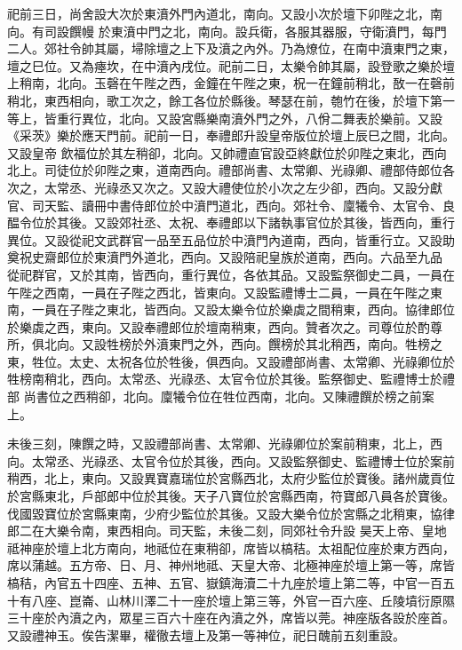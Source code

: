 \begin{pinyinscope}
 祀前三日，尚舍設大次於東濆外門內道北，南向。又設小次於壇下卯陛之北，南向。有司設饌幔
 於東濆中門之北，南向。設兵衛，各服其器服，守衛濆門，每門二人。郊社令帥其屬，埽除壇之上下及濆之內外。乃為燎位，在南中濆東門之東，壇之巳位。又為瘞坎，在中濆內戌位。祀前二日，太樂令帥其屬，設登歌之樂於壇上稍南，北向。玉磬在午陛之西，金鐘在午陛之東，柷一在鐘前稍北，敔一在磬前稍北，東西相向，歌工次之，餘工各位於縣後。琴瑟在前，匏竹在後，於壇下第一等上，皆重行異位，北向。又設宮縣樂南濆外門之外，八佾二舞表於樂前。又設《采茨》樂於應天門前。祀前一日，奉禮郎升設皇帝版位於壇上辰巳之間，北向。又設皇帝
 飲福位於其左稍卻，北向。又帥禮直官設亞終獻位於卯陛之東北，西向北上。司徒位於卯陛之東，道南西向。禮部尚書、太常卿、光祿卿、禮部侍郎位各次之，太常丞、光祿丞又次之。又設大禮使位於小次之左少卻，西向。又設分獻官、司天監、讀冊中書侍郎位於中濆門道北，西向。郊社令、廩犧令、太官令、良醖令位於其後。又設郊社丞、太祝、奉禮郎以下諸執事官位於其後，皆西向，重行異位。又設從祀文武群官一品至五品位於中濆門內道南，西向，皆重行立。又設助奠祝史齋郎位於東濆門外道北，西向。又設陪祀皇族於道南，西向。六品至九品
 從祀群官，又於其南，皆西向，重行異位，各依其品。又設監祭御史二員，一員在午陛之西南，一員在子陛之西北，皆東向。又設監禮博士二員，一員在午陛之東南，一員在子陛之東北，皆西向。又設太樂令位於樂虡之間稍東，西向。協律郎位於樂虡之西，東向。又設奉禮郎位於壇南稍東，西向。贊者次之。司尊位於酌尊所，俱北向。又設牲榜於外濆東門之外，西向。饌榜於其北稍西，南向。牲榜之東，牲位。太史、太祝各位於牲後，俱西向。又設禮部尚書、太常卿、光祿卿位於牲榜南稍北，西向。太常丞、光祿丞、太官令位於其後。監祭御史、監禮博士於禮部
 尚書位之西稍卻，北向。廩犧令位在牲位西南，北向。又陳禮饌於榜之前案上。



 未後三刻，陳饌之時，又設禮部尚書、太常卿、光祿卿位於案前稍東，北上，西向。太常丞、光祿丞、太官令位於其後，西向。又設監祭御史、監禮博士位於案前稍西，北上，東向。又設異寶嘉瑞位於宮縣西北，太府少監位於寶後。諸州歲貢位於宮縣東北，戶部郎中位於其後。天子八寶位於宮縣西南，符寶郎八員各於寶後。伐國毀寶位於宮縣東南，少府少監位於其後。又設大樂令位於宮縣之北稍東，協律郎二在大樂令南，東西相向。司天監，未後二刻，同郊社令升設
 昊天上帝、皇地祗神座於壇上北方南向，地祗位在東稍卻，席皆以槁秸。太祖配位座於東方西向，席以蒲越。五方帝、日、月、神州地祗、天皇大帝、北極神座於壇上第一等，席皆槁秸，內官五十四座、五神、五官、嶽鎮海瀆二十九座於壇上第二等，中官一百五十有八座、崑崙、山林川澤二十一座於壇上第三等，外官一百六座、丘陵墳衍原隰三十座於內濆之內，眾星三百六十座在內濆之外，席皆以莞。神座版各設於座首。又設禮神玉。俟告潔畢，權徹去壇上及第一等神位，祀日醜前五刻重設。




\end{pinyinscope}
